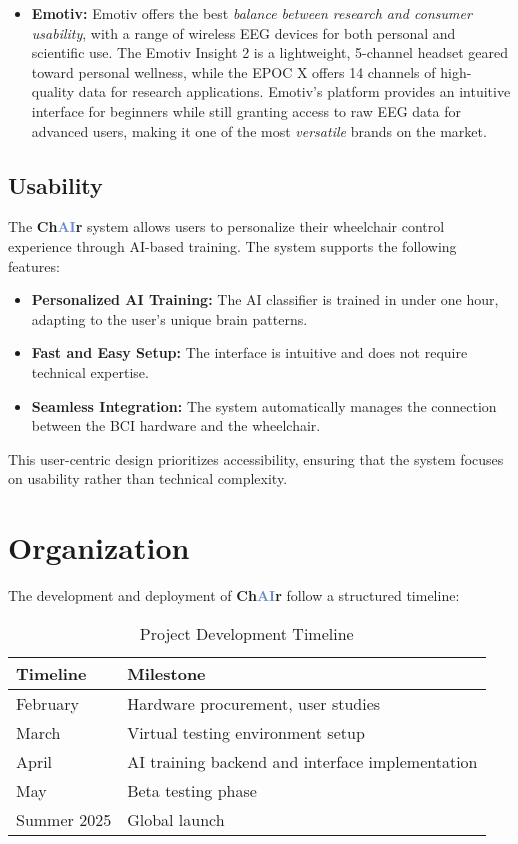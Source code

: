\documentclass[a4paper]{article}
\newcommand\chair{\textbf{Ch\textcolor[HTML]{6B8ACD}{AI}r}\xspace}
\begin{document}
\begin{itemize}
    \item \textbf{Emotiv:} Emotiv offers the best \textit{balance between research and consumer usability}, with a range of wireless EEG devices for both personal and scientific use. The Emotiv Insight 2 is a lightweight, 5-channel headset geared toward personal wellness, while the EPOC X offers 14 channels of high-quality data for research applications. Emotiv's platform provides an intuitive interface for beginners while still granting access to raw EEG data for advanced users, making it one of the most \textit{versatile} brands on the market.
\end{itemize}

\subsection{Usability}

The \chair system allows users to personalize their wheelchair control experience through
AI-based training. The system supports the following features:

\begin{itemize}
    \item \textbf{Personalized AI Training:} The AI classifier is trained in under one hour, adapting to the user's unique brain patterns.
    \item \textbf{Fast and Easy Setup:} The interface is intuitive and does not require technical expertise.
    \item \textbf{Seamless Integration:} The system automatically manages the connection between the BCI hardware and the wheelchair.
\end{itemize}

This user-centric design prioritizes accessibility, ensuring that the system focuses on
usability rather than technical complexity.

\section{Organization}

The development and deployment of \chair follow a structured timeline:
\begin{table}[ht]
    \centering
    \begin{tabular}{ll}
    \toprule
    Timeline & Milestone \\
    \midrule
    February & Hardware procurement, user studies \\
    March & Virtual testing environment setup \\
    April & AI training backend and interface implementation \\
    May & Beta testing phase \\
    Summer 2025 & Global launch \\
    \bottomrule
    \end{tabular}
    \caption{Project Development Timeline}
\end{table}
\end{document}
